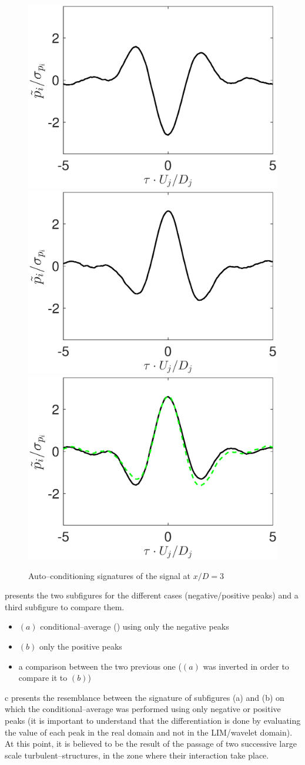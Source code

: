 \begin{figure}
	\centering
	\includegraphics[width=0.45\linewidth]{Figures/negativePeak.eps}%
	\includegraphics[width=0.45\linewidth]{Figures/positivePeak.eps}\\	
	\includegraphics[width=0.45\linewidth]{Figures/compPeaks}
	\caption{Auto--conditioning signatures of the signal at $x/D = 3$} \label{fig:compPeaks}
\end{figure}
 presents the two subfigures for the different cases (negative/positive peaks) and a third subfigure to compare them.
\begin{itemize}
  \item $(a)$ conditional--average () using only the negative peaks
  \item $(b)$ only the positive peaks
  \item a comparison between the two previous one ($(a)$ was inverted in order to compare it to $(b)$)
\end{itemize}
c presents the resemblance between the signature of subfigures (a) and (b) on which the conditional--average was performed using only negative or positive peaks (it is important to understand that the differentiation is done by evaluating the value of each peak in the real domain and not in the LIM/wavelet domain). At this point, it is believed to be the result of the passage of two successive large scale turbulent--structures, in the zone where their interaction take place.
